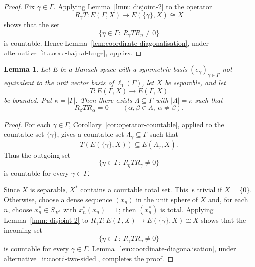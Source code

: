 \documentclass[11pt]{amsart}
\theoremstyle{plain}
\newtheorem{lemma}[theorem]{Lemma}
\theoremstyle{definition}
\numberwithin{equation}{section}
\newcommand{\abs}[1]{\left|#1\right|}
\begin{document}
\begin{proof}
Fix $\gamma\in\Gamma$.  Applying Lemma~\ref{lmm: disjoint-2} to the operator
\[
    R_\gamma T\colon E(\Gamma,X)\to E(\{\gamma\},X)\cong X
\]
shows that the set
\[
    \{\eta\in\Gamma:\ R_\gamma T R_\eta\neq0\}
\]
is countable.  Hence Lemma~\ref{lem:coordinate-diagonalisation}, under alternative~\ref{it:coord-hajnal-large}, applies.
\end{proof}


\begin{lemma}\label{lem:block-decomp3}
Let $E$ be a Banach space with a symmetric basis $(e_\gamma)_{\gamma\in\Gamma}$ not equivalent to the unit vector basis of $\ell_1(\Gamma)$, let $X$ be separable, and let
\[
    T\colon E(\Gamma,X)\to E(\Gamma,X)
\]
be bounded.  Put $\kappa=\abs{\Gamma}$.  Then there exists $\Lambda\subseteq\Gamma$ with $\abs{\Lambda}=\kappa$ such that
\[
    R_\beta T R_\alpha = 0
    \qquad(\alpha,\beta\in\Lambda,\ \alpha\neq\beta).
\]
\end{lemma}

\begin{proof}
For each $\gamma\in\Gamma$, Corollary~\ref{cor:operator-countable}, applied to the countable set $\{\gamma\}$, gives a countable set $\Lambda_\gamma\subseteq\Gamma$ such that
\[
    T(E(\{\gamma\},X))\subseteq E(\Lambda_\gamma,X).
\]
Thus the outgoing set
\[
    \{\eta\in\Gamma:\ R_\eta T R_\gamma\neq0\}
\]
is countable for every $\gamma\in\Gamma$.

Since $X$ is separable, $X^*$ contains a countable total set.  This is trivial if $X=\{0\}$.  Otherwise, choose a dense sequence $(x_n)$ in the unit sphere of $X$ and, for each $n$, choose $x_n^*\in S_{X^*}$ with $x_n^*(x_n)=1$; then $(x_n^*)$ is total.  Applying Lemma~\ref{lmm: disjoint-2} to $R_\gamma T\colon E(\Gamma,X)\to E(\{\gamma\},X)\cong X$ shows that the incoming set
\[
    \{\eta\in\Gamma:\ R_\gamma T R_\eta\neq0\}
\]
is countable for every $\gamma\in\Gamma$.  Lemma~\ref{lem:coordinate-diagonalisation}, under alternative~\ref{it:coord-two-sided}, completes the proof.
\end{proof}
\end{document}
